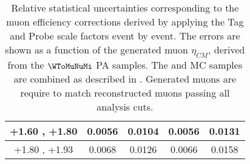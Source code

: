 \begin{table}[h!]
\begin{tabular}{|c|*4c|}
    \hline
    +1.60 , +1.80 & 0.0056 & 0.0104 & 0.0056 & 0.0131\\
    \hline
    +1.80 , +1.93 & 0.0068 & 0.0126 & 0.0066 & 0.0158\\
    \hline
  \end{tabular}
  \caption{Relative statistical uncertainties corresponding to the muon efficiency corrections derived by applying the Tag and Probe scale factors event by event. The errors are shown as a function of the generated muon $\eta_{CM}$, derived from the $\WToMuNuMi$ PA \POWHEG samples. The \pPb and \Pbp MC samples are combined as described in . Generated muons are require to match reconstructed muons passing all analysis cuts.}
  \label{tab:tnpStatUncertainty_WToMu_Minus_PA}
\end{table}


